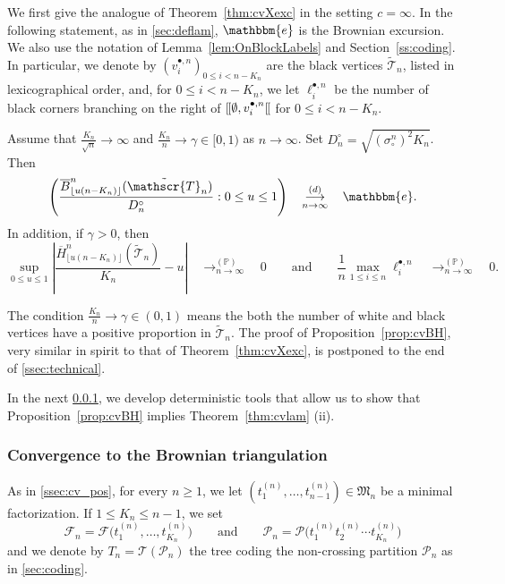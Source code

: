 \documentclass[AHL,XML,longabstracts,Unicode]{cedram}
\renewcommand{\P}{\mathbb{P}}
\def\PPP{\mathcal P}
\def\FFF{\mathcal F}
\def\scn{\sigma_{\circ}^{n}}
\def\Dcn{D^{\circ}_{n}}
\def\oB{\overline{B}}
\def\oH{\overline{H}}
\def\tTs{\tilde{\Ts}}
\def\Ts{\mathscr{T}}
\def\llbracket{[\hspace{-.10em} [ }
\begin{document}
We first give the analogue of  Theorem~\ref{thm:cvXexc} in the setting $c=\infty$.
In the following statement, as in \cref{sec:deflam},
$\mathbbm{e}$ is the Brownian excursion.
We also use the notation of Lemma~\ref{lem:OnBlockLabels} and Section~\ref{ss:coding}.
 In particular,
 we denote by  $(v^{\bullet,n}_{i})_{0 \leq i < n-K_{n}}$ are the black vertices $\tTs_n$, listed in lexicographical order,
 and, for $0 \leq i < n-K_{n}$,
 we let $\ell^{\bullet,n}_{i}$ be  the number of black corners
 branching on the right of  $\llbracket \emptyset, v^{\bullet,n}_{i} \llbracket$ for $0 \leq i < n-K_{n}$.
\begin{proposition}
\label{prop:cvBH}
Assume that $\tfrac{K_{n}}{\sqrt{n}} \rightarrow \infty$ and $ \tfrac{K_{n}}{n}  \rightarrow \gamma \in [0,1)$ as $n \rightarrow \infty$. Set $\Dcn=\sqrt{ (\scn)^{2} K_{n} }$. Then
\[  \left(  \frac{\oB^{n}_{\lfloor u (n-K_{n}) \rfloor}(\tTs_{n})}{ \Dcn} : 0\leq u \leq 1\right)  \quad \mathop{\longrightarrow}^{(d)}_{n \rightarrow \infty} \quad\mathbbm{e}.\]
In addition, if $\gamma>0$, then
\[  \sup_{0 \leq u \leq 1} \left|   \frac{\oH^{n}_{ \lfloor u (n-K_{n}) \rfloor }(\tTs_{n})}{K_{n}}-u\right|  \quad \mathop{\longrightarrow}^{(\P)}_{n \rightarrow \infty} \quad 0 \qquad \textrm{and} \qquad \frac{1}{n} \max_{1 \leq i \leq n} \ell^{\bullet,n}_{i}  \quad \mathop{\longrightarrow}^{(\P)}_{n \rightarrow \infty} \quad 0.\]
\end{proposition}
The condition $ \tfrac{K_{n}}{n}  \rightarrow \gamma \in (0,1)$ means the both the number of white and black vertices have a positive proportion in $\tilde{\Ts}_{n}$. The proof of Proposition~\ref{prop:cvBH}, very similar in spirit to that of Theorem~\ref{thm:cvXexc}, is postponed  to the end of \cref{ssec:technical}.




In the next \cref{sec:cvBT}, we develop deterministic tools that allow us to show that Proposition~\ref{prop:cvBH} implies Theorem~\ref{thm:cvlam} (ii).



\subsubsection{Convergence to the Brownian triangulation}
\label{sec:cvBT}
As in \cref{ssec:cv_pos}, for every $n \geq 1$, we let $(t_{1}^{(n)}, \ldots, t_{n-1}^{(n)}) \in \mathfrak{M}_{n}$  be a minimal factorization. If $1 \leq K_{n} \leq n-1$, we set
\[  \FFF_{n}= \FFF \big( t_{1}^{(n)}, \ldots, t_{K_{n}}^{(n)}\big) \qquad \text{and} \qquad \PPP_{n}= \PPP\big(  t_{1}^{(n)}  t_{2}^{(n)}  \cdots t_{K_{n}}^{(n)}\big)\]
and we denote by $T_{n}= \mathcal{T}( \PPP_{n})$   the tree coding the non-crossing partition  $\PPP_{n}$ as in \cref{sec:coding}.
\end{document}
